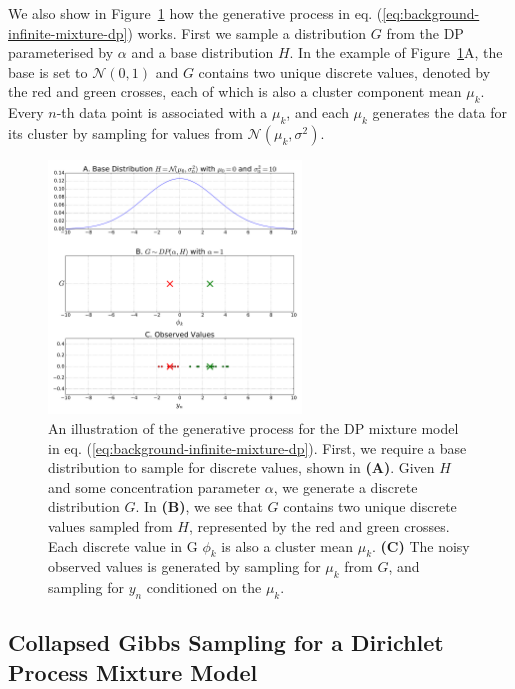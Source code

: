 We also show in Figure~\ref{fig:g-from-dp} how the generative process in eq. (\ref{eq:background-infinite-mixture-dp}) works. First we sample a distribution $G$ from the DP parameterised by $\alpha$ and a base distribution $H$. In the example of Figure~\ref{fig:g-from-dp}A, the base is set to $\mathcal{N}(0, 1)$ and $G$ contains two unique discrete values, denoted by the red and green crosses, each of which is also a cluster component mean $\mu_k$. Every $n$-th data point is associated with a $\mu_k$, and each $\mu_k$ generates the data for its cluster by sampling for values from $\mathcal{N}(\mu_k, \sigma^2)$. 
\begin{figure}
\noindent \begin{centering}
\includegraphics[width=0.6\textwidth]{03-machine-learning/figures/dp_samples.pdf}
\par\end{centering}
\caption[An illustration of the generative process for the DP mixture model in eq. (\ref{eq:background-infinite-mixture-dp}).]{\label{fig:g-from-dp}An illustration of the generative process for the DP mixture model in eq. (\ref{eq:background-infinite-mixture-dp}). First, we require a base distribution to sample for discrete values, shown in \textbf{(A)}. Given $H$ and some concentration parameter $\alpha$, we generate a discrete distribution $G$. In \textbf{(B)}, we see that $G$ contains two unique discrete values sampled from $H$, represented by the red and green crosses. Each discrete value in G $\phi_k$ is also a cluster mean $\mu_k$. \textbf{(C)} The noisy observed values is generated by sampling for $\mu_k$ from $G$, and sampling for $y_n$ conditioned on the $\mu_k$.}
\end{figure}

\subsection{Collapsed Gibbs Sampling for a Dirichlet Process Mixture Model \label{background-cgs-dpmixture}}

